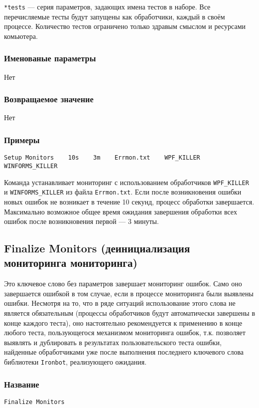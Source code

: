 \documentclass[11pt]{book} %
\begin{document}
\verb"*tests" --- серия параметров, задающих имена тестов в наборе. Все перечисляемые тесты будут запущены как обработчики, каждый в своём процессе. Количество тестов ограничено только здравым смыслом и ресурсами комьютера.


\subsubsection*{Именованые параметры} 
Нет


\subsubsection*{Возвращаемое значение} 
Нет

\subsubsection*{Примеры}
\begin{verbatim}Setup Monitors    10s    3m    Errmon.txt    WPF_KILLER    WINFORMS_KILLER\end{verbatim}

Команда устанавливает мониторинг с использованием обработчиков \verb|WPF_KILLER| и \verb|WINFORMS_KILLER| из файла \verb|Errmon.txt|. Если после возникновения ошибки новых ошибок не возникает в течение 10 секунд, процесс обработки завершается. Максимально возможное общее время ожидания завершения обработки всех ошибок после возникновения первой --- 3 минуты. 






\subsection{Finalize Monitors (деинициализация мониторинга мониторинга)}
    Это ключевое слово без параметров завершает мониторинг ошибок. Само оно завершается ошибкой в том случае, если в процессе мониторинга были выявлены ошибки. Несмотря на то, что в ряде ситуаций использование этого слова не является обязательным (процессы обработчиков будут автоматически завершены в конце каждого теста), оно настоятельно рекомендуется к применению в конце любого теста, пользующегося механизмом мониторинга ошибок, т.к. позволяет выявлять и дублировать в результатах пользовательского теста ошибки, найденные обработчиками уже после выполнения последнего ключевого слова библиотеки \verb|Ironbot|, реализующего ожидания.

\subsubsection*{Название} 
\verb"Finalize Monitors"
\end{document}
